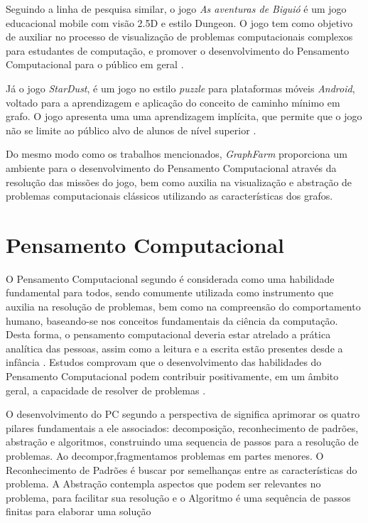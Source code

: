 \documentclass[10pt, conference, compsocconf]{IEEEtran}
\begin{document}
 Seguindo a linha de pesquisa similar, o jogo \textit{As aventuras de Biguió} é um jogo educacional mobile com visão 2.5D e estilo Dungeon. O jogo tem como objetivo de auxiliar no processo de visualização de problemas computacionais complexos para estudantes de computação, e promover o desenvolvimento do Pensamento Computacional para o público em geral \cite{melo2019aventuras}.
 
 Já o jogo \textit{StarDust}, é um jogo no estilo \textit{puzzle} para plataformas móveis \textit{Android}, voltado para a aprendizagem e aplicação do conceito de caminho mínimo em grafo. O jogo apresenta uma uma aprendizagem implícita, que permite que o jogo não se limite ao público alvo de alunos de nível superior \cite{melo2019stardust}.
 
 Do mesmo modo como os trabalhos mencionados, \textit{GraphFarm} proporciona um ambiente para o desenvolvimento do Pensamento Computacional através da resolução das missões do jogo, bem como auxilia na visualização e abstração de problemas computacionais clássicos utilizando as características dos grafos. 
 

\section{Pensamento Computacional}


O Pensamento Computacional segundo \cite{wing2006computational} é considerada como uma habilidade fundamental para todos, sendo comumente utilizada como instrumento que auxilia na resolução de problemas, bem como na compreensão do comportamento humano, baseando-se nos conceitos fundamentais da ciência da computação. Desta forma, o pensamento computacional deveria estar atrelado a prática analítica das pessoas, assim como a leitura e a escrita estão presentes desde a infância \cite{de2018ecologic}. Estudos comprovam que o desenvolvimento das habilidades do Pensamento Computacional podem contribuir positivamente, em um âmbito geral, a capacidade de resolver de problemas \cite{goulart2019labirinto,de2018ecologic,alencar2019looking}.

O desenvolvimento do PC segundo a perspectiva de \cite{learning2015computational} significa aprimorar os quatro pilares fundamentais a ele associados: decomposição, reconhecimento de padrões, abstração e algoritmos, construindo uma sequencia de passos para a resolução de problemas. Ao decompor,fragmentamos problemas em partes menores. O Reconhecimento de Padrões é buscar por semelhanças entre as características do problema. A Abstração contempla aspectos que podem ser relevantes no problema, para facilitar sua resolução e o Algoritmo é uma sequência de passos finitas para elaborar uma solução \cite{ferreira2019uso}
\end{document}

